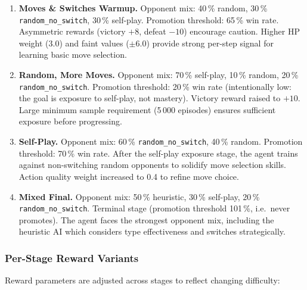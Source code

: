 \begin{enumerate}
  \item \textbf{Moves \& Switches Warmup.}
        Opponent mix: 40\,\% random, 30\,\% \texttt{random\_no\_switch},
        30\,\% self-play.  Promotion threshold: 65\,\% win rate.
        Asymmetric rewards (victory $+8$, defeat $-10$) encourage caution.
        Higher HP weight (3.0) and faint values ($\pm 6.0$) provide strong
        per-step signal for learning basic move selection.

  \item \textbf{Random, More Moves.}
        Opponent mix: 70\,\% self-play, 10\,\% random,
        20\,\% \texttt{random\_no\_switch}.  Promotion threshold: 20\,\% win
        rate (intentionally low: the goal is exposure to self-play, not
        mastery).  Victory reward raised to $+10$.  Large minimum sample
        requirement (5\,000 episodes) ensures sufficient exposure before
        progressing.

  \item \textbf{Self-Play.}
        Opponent mix: 60\,\% \texttt{random\_no\_switch},
        40\,\% random.  Promotion threshold: 70\,\% win rate.
        After the self-play exposure stage, the agent trains against
        non-switching random opponents to solidify move selection skills.
        Action quality weight increased to 0.4 to refine move choice.

  \item \textbf{Mixed Final.}
        Opponent mix: 50\,\% heuristic, 30\,\% self-play,
        20\,\% \texttt{random\_no\_switch}.  Terminal stage (promotion
        threshold 101\,\%, i.e.\ never promotes).  The agent faces the
        strongest opponent mix, including the heuristic AI which considers
        type effectiveness and switches strategically.
\end{enumerate}


\subsubsection{Per-Stage Reward Variants}

Reward parameters are adjusted across stages to reflect changing difficulty:

